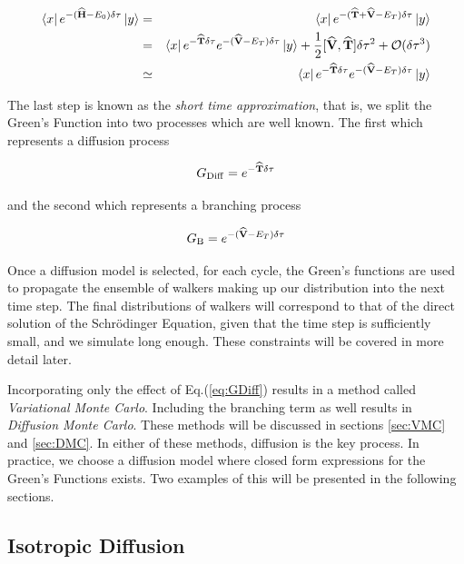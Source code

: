 \begin{eqnarray}
 \left< x \right|e^{-({\bf\widehat{H}} - E_0)\delta\tau}\left| y \right> &=& \left< x \right|e^{-({\bf\widehat{T}} + {\bf\widehat{V}} - E_T)\delta\tau}\left| y \right> \nonumber \\
                                             &=& \left< x \right|e^{-{\bf\widehat{T}}\delta\tau}e^{-({\bf\widehat{V}} - E_T)\delta\tau}\left| y \right> + \frac{1}{2}[{\bf\widehat{V}}, {\bf\widehat{T}}]\delta\tau^2 + \mathcal{O}(\delta\tau^3) \nonumber \\
                                             &\simeq& \left< x \right|e^{-{\bf\widehat{T}}\delta\tau}e^{-({\bf\widehat{V}} - E_T)\delta\tau}\left| y \right> 
\end{eqnarray}

The last step is known as the \textit{short time approximation}, that is, we split the Green's Function into two processes which are well known. The first which represents a diffusion process

\begin{equation}
\label{eq:GDiff}
 G_\mathrm{Diff} = e^{-{\bf\widehat{T}}\delta\tau}
\end{equation}

and the second which represents a branching process

\begin{equation}
 \label{eq:GB}
 G_\mathrm{B} = e^{-({\bf\widehat{V}} - E_T)\delta\tau}
\end{equation}

Once a diffusion model is selected, for each cycle, the Green's functions are used to propagate the ensemble of walkers making up our distribution into the next time step. The final distributions of walkers will correspond to that of the direct solution of the Schrödinger Equation, given that the time step is sufficiently small, and we simulate long enough. These constraints will be covered in more detail later. 

Incorporating only the effect of Eq.(\ref{eq:GDiff}) results in a method called \textit{Variational Monte Carlo}. Including the branching term as well results in \textit{Diffusion Monte Carlo}. These methods will be discussed in sections \ref{sec:VMC} and \ref{sec:DMC}. In either of these methods, diffusion is the key process. In practice, we choose a diffusion model where closed form expressions for the Green's Functions exists. Two examples of this will be presented in the following sections.



\subsection{Isotropic Diffusion}

